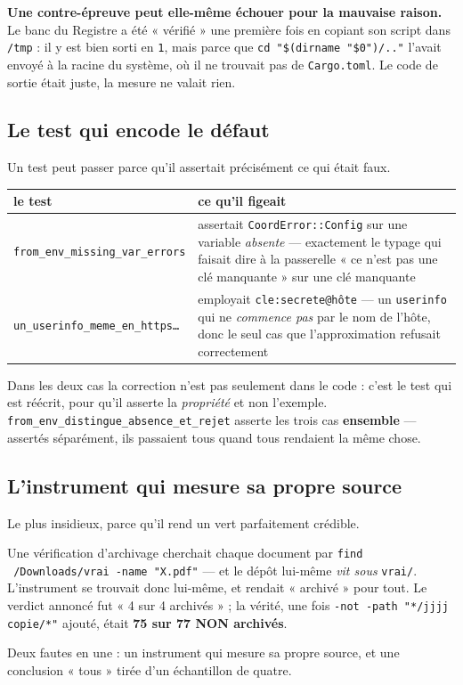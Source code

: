 \documentclass[10pt]{report}
\newcommand{\code}[1]{\texttt{\small #1}}
\newcommand{\att}[1]{\textcolor{amber}{\textbf{#1}}}
\begin{document}
\att{Une contre-épreuve peut elle-même échouer pour la mauvaise raison.} Le banc du Registre a été
« vérifié » une première fois en copiant son script dans \code{/tmp} : il y est bien sorti en
\code{1}, mais parce que \code{cd "\$(dirname "\$0")/.."} l'avait envoyé à la racine du système, où
il ne trouvait pas de \code{Cargo.toml}. Le code de sortie était juste, la mesure ne valait rien.

\subsection{Le test qui encode le défaut}

Un test peut passer parce qu'il assertait précisément ce qui était faux.

\begin{longtable}{@{}p{5.4cm}p{9.6cm}@{}}
\toprule \textbf{le test} & \textbf{ce qu'il figeait} \\ \midrule \endhead
\code{from\_env\_missing\_var\_errors} & assertait \code{CoordError::Config} sur une variable \emph{absente} --- exactement le typage qui faisait dire à la passerelle « ce n'est pas une clé manquante » sur une clé manquante \\
\code{un\_userinfo\_meme\_en\_https…} & employait \code{cle:secrete@hôte} --- un \code{userinfo} qui ne \emph{commence pas} par le nom de l'hôte, donc le seul cas que l'approximation refusait correctement \\
\bottomrule
\end{longtable}

Dans les deux cas la correction n'est pas seulement dans le code : c'est le test qui est réécrit, pour
qu'il asserte la \emph{propriété} et non l'exemple. \code{from\_env\_distingue\_absence\_et\_rejet}
asserte les trois cas \textbf{ensemble} --- assertés séparément, ils passaient tous quand tous
rendaient la même chose.

\subsection{L'instrument qui mesure sa propre source}

Le plus insidieux, parce qu'il rend un vert parfaitement crédible.

\begin{alerte}
Une vérification d'archivage cherchait chaque document par
\code{find ~/Downloads/vrai -name "X.pdf"} --- et le dépôt lui-même \emph{vit sous} \code{vrai/}.
L'instrument se trouvait donc lui-même, et rendait « archivé » pour tout. Le verdict annoncé fut
« 4 sur 4 archivés » ; la vérité, une fois \code{-not -path "*/jjjj copie/*"} ajouté, était
\textbf{75 sur 77 NON archivés}.

Deux fautes en une : un instrument qui mesure sa propre source, et une conclusion « tous » tirée d'un
échantillon de quatre.
\end{alerte}
\end{document}
